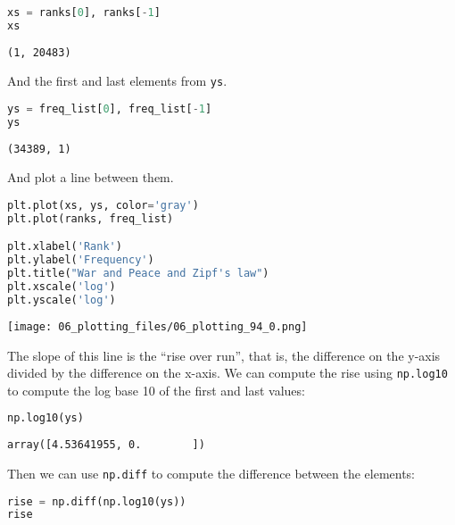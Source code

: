 \begin{lstlisting}[language=Python,style=source]
xs = ranks[0], ranks[-1]
xs
\end{lstlisting}

\begin{lstlisting}[style=output]
(1, 20483)
\end{lstlisting}

And the first and last elements from \passthrough{\lstinline!ys!}.

\begin{lstlisting}[language=Python,style=source]
ys = freq_list[0], freq_list[-1]
ys
\end{lstlisting}

\begin{lstlisting}[style=output]
(34389, 1)
\end{lstlisting}

And plot a line between them.

\begin{lstlisting}[language=Python,style=source]
plt.plot(xs, ys, color='gray')
plt.plot(ranks, freq_list)

plt.xlabel('Rank')
plt.ylabel('Frequency')
plt.title("War and Peace and Zipf's law")
plt.xscale('log')
plt.yscale('log')
\end{lstlisting}

\begin{center}
\texttt{[image: 06\_plotting\_files/06\_plotting\_94\_0.png]}
\end{center}

The slope of this line is the ``rise over run'', that is, the difference
on the y-axis divided by the difference on the x-axis. We can compute
the rise using \passthrough{\lstinline!np.log10!} to compute the log
base 10 of the first and last values:

\begin{lstlisting}[language=Python,style=source]
np.log10(ys)
\end{lstlisting}

\begin{lstlisting}[style=output]
array([4.53641955, 0.        ])
\end{lstlisting}

Then we can use \passthrough{\lstinline!np.diff!} to compute the
difference between the elements:

\begin{lstlisting}[language=Python,style=source]
rise = np.diff(np.log10(ys))
rise
\end{lstlisting}

